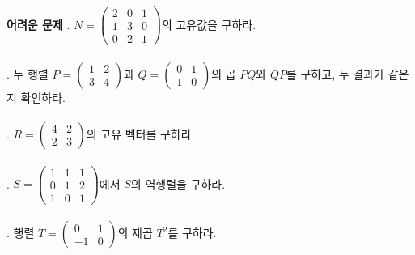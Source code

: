 \documentclass[fleqn]{article}
\begin{document}
\textbf{어려운 문제}  
. \( N = \begin{pmatrix} 2 & 0 & 1 \\ 1 & 3 & 0 \\ 0 & 2 & 1 \end{pmatrix} \)의 고유값을 구하라.  
\\\\  
. 두 행렬 \( P = \begin{pmatrix} 1 & 2 \\ 3 & 4 \end{pmatrix} \)과 \( Q = \begin{pmatrix} 0 & 1 \\ 1 & 0 \end{pmatrix} \)의 곱 \( PQ \)와 \( QP \)를 구하고, 두 결과가 같은지 확인하라.  
\\\\  
. \( R = \begin{pmatrix} 4 & 2 \\ 2 & 3 \end{pmatrix} \)의 고유 벡터를 구하라.  
\\\\  
. \( S = \begin{pmatrix} 1 & 1 & 1 \\ 0 & 1 & 2 \\ 1 & 0 & 1 \end{pmatrix} \)에서 \( S \)의 역행렬을 구하라.  
\\\\  
. 행렬 \( T = \begin{pmatrix} 0 & 1 \\ -1 & 0 \end{pmatrix} \)의 제곱 \( T^2 \)를 구하라.  
\\\\  
\end{document}
